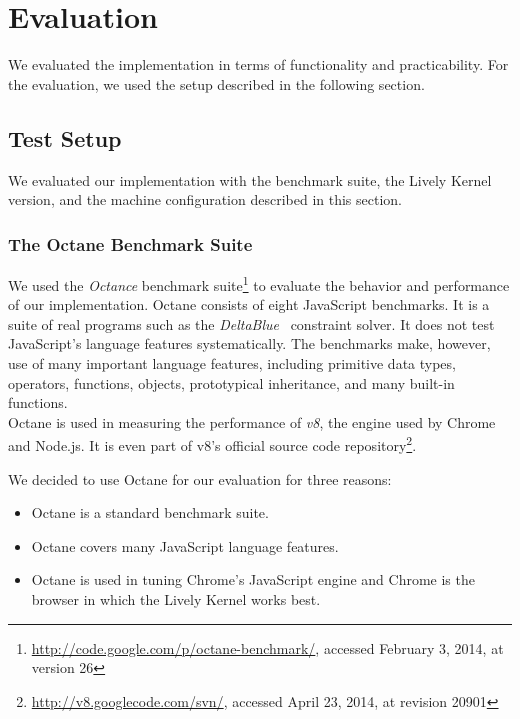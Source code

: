 \chapter{Evaluation} \label{chapter:EVALUATION}

We evaluated the implementation in terms of functionality and practicability.
For the evaluation, we used the setup described in the following section.


\section{Test Setup} \label{sec:EVALUATION:1}

We evaluated our implementation with the benchmark suite, the Lively Kernel version, and the machine configuration described in this section.

\subsection{The Octane Benchmark Suite}

We used the \emph{Octance} benchmark suite\footnote{\url{http://code.google.com/p/octane-benchmark/}, accessed February 3, 2014, at version 26} to evaluate the behavior and performance of our implementation.
Octane consists of eight JavaScript benchmarks.
It is a suite of real programs such as the \emph{DeltaBlue}~\cite{FreemanBenson1990ICS} constraint solver.
It does not test JavaScript's language features systematically.
The benchmarks make, however, use of many important language features, including primitive data types, operators, functions, objects, prototypical inheritance, and many built-in functions.\\
Octane is used in measuring the performance of \emph{v8}, the engine used by Chrome and Node.js.
It is even part of v8's official source code repository\footnote{\url{http://v8.googlecode.com/svn/}, accessed April 23, 2014, at revision 20901}.

We decided to use Octane for our evaluation for three reasons:

\begin{itemize}
    \item Octane is a standard benchmark suite.
    \item Octane covers many JavaScript language features.
    \item Octane is used in tuning Chrome's JavaScript engine and Chrome is the browser in which the Lively Kernel works best.
\end{itemize}


